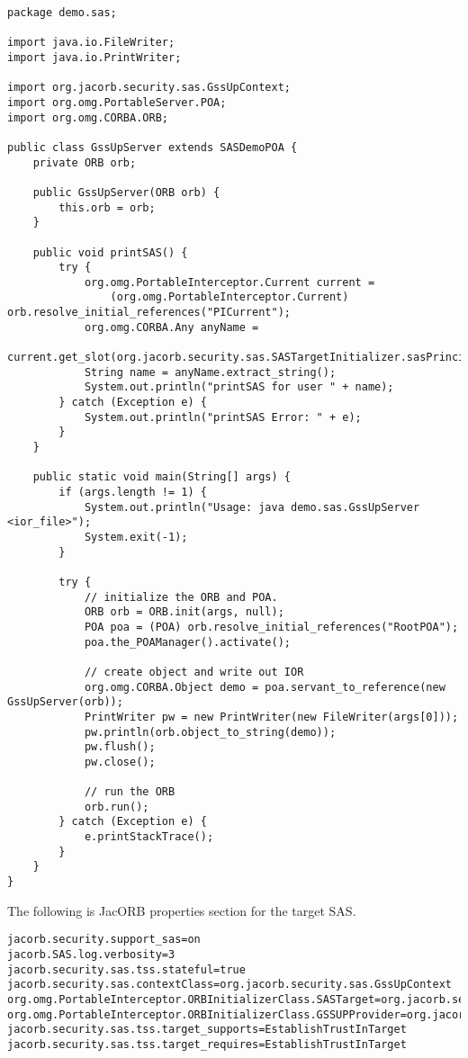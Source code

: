 \begin{scriptsize}
\begin{verbatim}
package demo.sas;

import java.io.FileWriter;
import java.io.PrintWriter;

import org.jacorb.security.sas.GssUpContext;
import org.omg.PortableServer.POA;
import org.omg.CORBA.ORB;

public class GssUpServer extends SASDemoPOA {
    private ORB orb;

    public GssUpServer(ORB orb) {
        this.orb = orb;
    }

    public void printSAS() {
        try {
            org.omg.PortableInterceptor.Current current = 
                (org.omg.PortableInterceptor.Current) orb.resolve_initial_references("PICurrent");
            org.omg.CORBA.Any anyName = 
                current.get_slot(org.jacorb.security.sas.SASTargetInitializer.sasPrincipalNamePIC);
            String name = anyName.extract_string();
            System.out.println("printSAS for user " + name);
        } catch (Exception e) {
            System.out.println("printSAS Error: " + e);
        }
    }

    public static void main(String[] args) {
        if (args.length != 1) {
            System.out.println("Usage: java demo.sas.GssUpServer <ior_file>");
            System.exit(-1);
        }

        try {
            // initialize the ORB and POA.
            ORB orb = ORB.init(args, null);
            POA poa = (POA) orb.resolve_initial_references("RootPOA");
            poa.the_POAManager().activate();
			
            // create object and write out IOR
            org.omg.CORBA.Object demo = poa.servant_to_reference(new GssUpServer(orb));
            PrintWriter pw = new PrintWriter(new FileWriter(args[0]));
            pw.println(orb.object_to_string(demo));
            pw.flush();
            pw.close();
			
            // run the ORB
            orb.run();
        } catch (Exception e) {
            e.printStackTrace();
        }
    }
}
\end{verbatim}
\end{scriptsize}

The following is JacORB properties section for the target SAS.

\begin{scriptsize}
\begin{verbatim}
jacorb.security.support_sas=on
jacorb.SAS.log.verbosity=3
jacorb.security.sas.tss.stateful=true
jacorb.security.sas.contextClass=org.jacorb.security.sas.GssUpContext
org.omg.PortableInterceptor.ORBInitializerClass.SASTarget=org.jacorb.security.sas.SASTargetInitializer
org.omg.PortableInterceptor.ORBInitializerClass.GSSUPProvider=org.jacorb.security.sas.GSSUPProviderInitializer
jacorb.security.sas.tss.target_supports=EstablishTrustInTarget
jacorb.security.sas.tss.target_requires=EstablishTrustInTarget
\end{verbatim}
\end{scriptsize}

